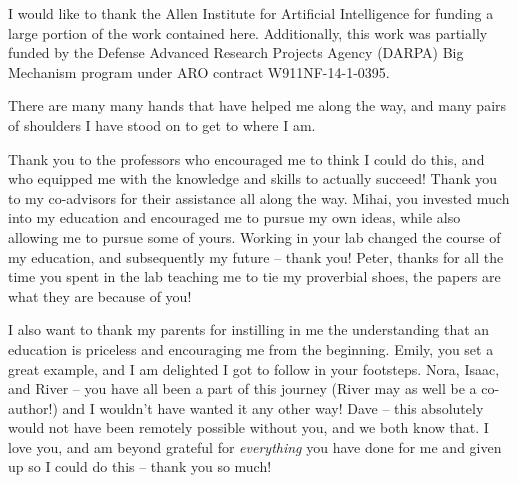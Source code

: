 I would like to thank the Allen Institute for Artificial Intelligence for funding a large portion of the work contained here.  Additionally, this work was partially funded by the Defense Advanced Research Projects Agency (DARPA) Big Mechanism program under ARO contract W911NF-14-1-0395.

There are many many hands that have helped me along the way, and many pairs of shoulders I have stood on to get to where I am.  

Thank you to the professors who encouraged me to think I could do this, and who equipped me with the knowledge and skills to actually succeed!  Thank you to my co-advisors for their assistance all along the way.  Mihai, you invested much into my education and encouraged me to pursue my own ideas, while also allowing me to pursue some of yours. Working in your lab changed the course of my education, and subsequently my future -- thank you!  Peter, thanks for all the time you spent in the lab teaching me to tie my proverbial shoes, the papers are what they are because of you!  

I also want to thank my parents for instilling in me the understanding that an education is priceless and encouraging me from the beginning. Emily, you set a great example, and I am delighted I got to follow in your footsteps.  Nora, Isaac, and River -- you have all been a part of this journey (River may as well be a co-author!) and I wouldn't have wanted it any other way!  Dave -- this absolutely would not have been remotely possible without you, and we both know that.  I love you, and am beyond grateful for \textit{everything} you have done for me and given up so I could do this -- thank you so much! 
